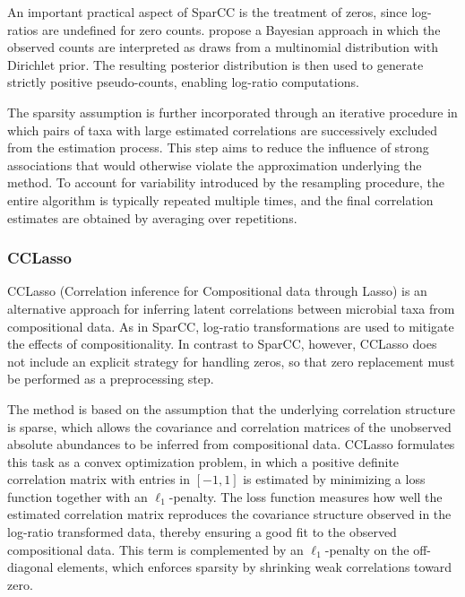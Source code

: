 An important practical aspect of SparCC is the treatment of zeros, since log-ratios are undefined for zero counts. \citet{friedman2012inferring} propose a Bayesian approach in which the observed counts are interpreted as draws from a multinomial distribution with Dirichlet prior. The resulting posterior distribution is then used to generate strictly positive pseudo-counts, enabling log-ratio computations.

The sparsity assumption is further incorporated through an iterative procedure in which pairs of taxa with large estimated correlations are successively excluded from the estimation process. This step aims to reduce the influence of strong associations that would otherwise violate the approximation underlying the method. To account for variability introduced by the resampling procedure, the entire algorithm is typically repeated multiple times, and the final correlation estimates are obtained by averaging over repetitions.

\subsubsection{CCLasso}
\label{sec:5net:net_constr:cclasso}

CCLasso (Correlation inference for Compositional data through Lasso) \citep{fang2015cclasso} is an alternative approach for inferring latent correlations between microbial taxa from compositional data. As in SparCC, log-ratio transformations are used to mitigate the effects of compositionality. In contrast to SparCC, however, CCLasso does not include an explicit strategy for handling zeros, so that zero replacement must be performed as a preprocessing step.

The method is based on the assumption that the underlying correlation structure is sparse, which allows the covariance and correlation matrices of the unobserved absolute abundances to be inferred from compositional data. CCLasso formulates this task as a convex optimization problem, in which a positive definite correlation matrix with entries in $[-1,1]$ is estimated by minimizing a loss function together with an $\ell_1$-penalty. The loss function measures how well the estimated correlation matrix reproduces the covariance structure observed in the log-ratio transformed data, thereby ensuring a good fit to the observed compositional data. This term is complemented by an $\ell_1$-penalty on the off-diagonal elements, which enforces sparsity by shrinking weak correlations toward zero.

